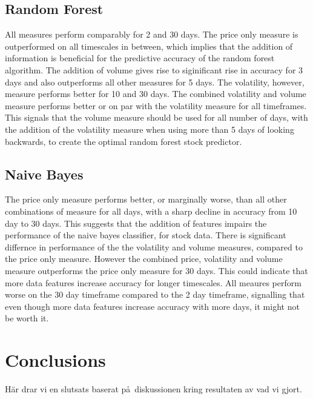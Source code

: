 \documentclass{article}
\begin{document}
\subsection{Random Forest}
All measures perform comparably for 2 and 30 days. The price only measure is outperformed on all timescales in between, which implies that the addition of information is beneficial for the predictive accuracy of the random forest algorithm. The addition of volume gives rise to siginificant rise in accuracy for 3 days and also outperforms all other measures for 5 days. The volatility, however,  measure performs better for 10 and 30 days. The combined volatility and volume measure performs better or on par with the volatility measure for all timeframes. This signals that the volume measure should be used for all number of days, with the addition of the volatility measure when using more than 5 days of looking backwards, to create the optimal random forest stock predictor.

\subsection{Naive Bayes}
The price only measure performs better, or marginally worse, than all other combinations of measure for all days, with a sharp decline in accuracy from 10 day to 30 days. This suggests that the addition of features impairs the performance of the naive bayes classifier, for stock data. There is significant differnce in performance of the the volatility and volume measures, compared to the price only measure. However the combined price, volatility and volume measure outperforms the price only measure for 30 days. This could indicate that more data features increase accuracy for longer timescales. All meaures perform worse on the 30 day timeframe compared to the 2 day timeframe, signalling that even though more data features increase accuracy with more days, it might not be worth it. 

\section{Conclusions}
H\"ar drar vi en slutsats baserat p\aa\ diskussionen kring resultaten av vad vi gjort.
\end{document}
